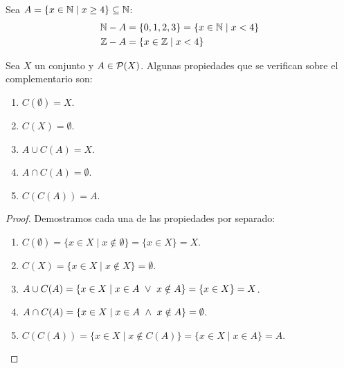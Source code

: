 \begin{ejemplo}
    Sea $A = \{x \in \mathbb N \mid x \geq 4\} \subseteq \mathbb N$:
    \begin{align*}
        \mathbb N - A &= \{0, 1, 2, 3\} = \{x \in \mathbb N \mid x < 4\}\\
        \mathbb Z - A &= \{x \in \mathbb Z \mid x < 4\}
    \end{align*}
\end{ejemplo}

\begin{prop} Sea $X$ un conjunto y $A \in \mathcal{P}(X)$. Algunas propiedades que se verifican sobre el complementario son:
    \begin{enumerate}
        \item $C(\emptyset) = X$.
        \item $C(X) = \emptyset$.
        \item $A \cup C(A) = X$.
        \item $A \cap C(A) = \emptyset$.
        \item $C(C(A)) = A$.
    \end{enumerate}
\end{prop}
\begin{proof}
    Demostramos cada una de las propiedades por separado:
    \begin{enumerate}
        \item $C(\emptyset) = \{x \in X \mid x \notin \emptyset\} = \{x \in X\} = X$.
        \item $C(X) = \{x \in X \mid x \notin X\} = \emptyset$.
        \item $A \cup C(A) = \{x \in X \mid x \in A \ \lor \  x \notin A \} = \{x \in X\} = X$.
        \item $A \cap C(A) = \{x \in X \mid x \in A \ \land \  x \notin A\} = \emptyset$.
        \item $C(C(A)) = \{x \in X \mid x \notin C(A) \} = \{x \in X \mid x \in A\} = A$.
    \end{enumerate}
\end{proof}

